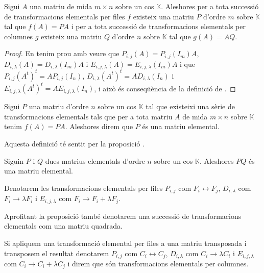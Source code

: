 \documentclass[../Apunts.tex]{subfiles}
\begin{document}
	\begin{proposition}
		\label{prop:transformacions elementals i matrius elementals}
		Sigui \(A\) una matriu de mida \(m\times n\) sobre un cos \(\mathbb{K}\). Aleshores per a tota successió de transformacions elementals per files \(f\) existeix una matriu \(P\) d'ordre \(m\) sobre \(\mathbb{K}\) tal que \(f(A)=PA\) i per a tota successió de transformacions elementals per columnes \(g\) existeix una matriu \(Q\) d'ordre \(n\) sobre \(\mathbb{K}\) tal que \(g(A)=AQ\).
%		
		\begin{proof}
			En tenim prou amb veure que \(P_{i,j}(A)=P_{i,j}(I_{m})A\), \(D_{i,\lambda}(A)=D_{i,\lambda}(I_{m})A\) i \(E_{i,j,\lambda}(A)=E_{i,j,\lambda}(I_{m})A\) i que \(P_{i,j}(A^{t})^{t}=AP_{i,j}(I_{n})\), \(D_{i,\lambda}(A^{t})^{t}=AD_{i,\lambda}(I_{n})\) i \(E_{i,j,\lambda}(A^{t})^{t}=AE_{i,j,\lambda}(I_{n})\), i això és conseqüència de la definició de .
		\end{proof}
	\end{proposition}
	\begin{definition}
		\label{def:matriu elemental}
		Sigui \(P\) una matriu d'ordre \(n\) sobre un cos \(\mathbb{K}\) tal que existeixi una sèrie de transformacions elementals tals que per a tota matriu \(A\) de mida \(m\times n\) sobre \(\mathbb{K}\) tenim \(f(A)=PA\). Aleshores direm que \(P\) és una matriu elemental.
		
		Aquesta definició té sentit per la proposició .
	\end{definition}
	\begin{observation}
		\label{obs:producte de matrius elementals és matriu elemental}
		Siguin \(P\) i \(Q\) dues matrius elementals d'ordre \(n\) sobre un cos \(\mathbb{K}\). Aleshores \(PQ\) és una matriu elemental.
	\end{observation}
	\begin{notation}
		Denotarem les transformacions elementals per files \(P_{i,j}\) com \(F_{i}\leftrightarrow F_{j}\), \(D_{i,\lambda}\) com \(F_{i}\rightarrow\lambda F_{i}\) i \(E_{i,j,\lambda}\) com \(F_{i}\rightarrow F_{i}+\lambda F_{j}\).
		
		Aprofitant la proposició  també denotarem una successió de transformacions elementals com una matriu quadrada.
		
		Si apliquem una transformació elemental per files a una matriu transposada i transposem el resultat denotarem \(P_{i,j}\) com \(C_{i}\leftrightarrow C_{j}\), \(D_{i,\lambda}\) com \(C_{i}\rightarrow\lambda C_{i}\) i \(E_{i,j,\lambda}\) com \(C_{i}\rightarrow C_{i}+\lambda C_{j}\) i direm que són transformacions elementals per columnes.
	\end{notation}
\end{document}
